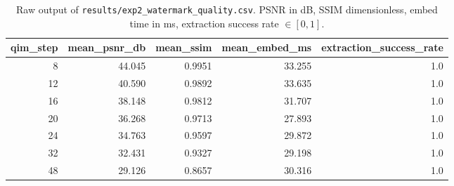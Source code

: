 \documentclass[11pt,a4paper]{article}
\begin{document}
\begin{table}[!ht]\centering
\caption{Raw output of \texttt{results/exp2\_watermark\_quality.csv}.
PSNR in dB, SSIM dimensionless, embed time in ms, extraction success
rate $\in[0,1]$.}\label{tab:raw-exp2}
\small
\begin{tabular}{r r r r r}
\toprule
qim\_step & mean\_psnr\_db & mean\_ssim & mean\_embed\_ms & extraction\_success\_rate \\
\midrule
 8 & 44.045 & 0.9951 & 33.255 & 1.0 \\
12 & 40.590 & 0.9892 & 33.635 & 1.0 \\
16 & 38.148 & 0.9812 & 31.707 & 1.0 \\
20 & 36.268 & 0.9713 & 27.893 & 1.0 \\
24 & 34.763 & 0.9597 & 29.872 & 1.0 \\
32 & 32.431 & 0.9327 & 29.198 & 1.0 \\
48 & 29.126 & 0.8657 & 30.316 & 1.0 \\
\bottomrule
\end{tabular}
\end{table}
\end{document}
